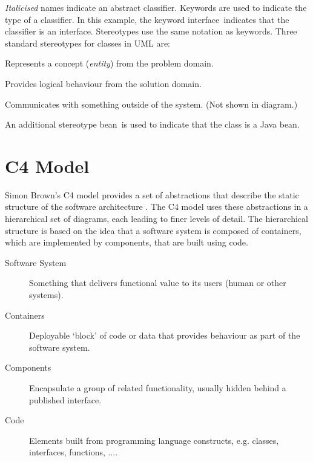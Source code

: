 \textit{Italicised} names indicate an abstract classifier. Keywords are used to indicate the type of a classifier.
In this example, the keyword \guillemotleft interface\guillemotright~indicates that the classifier is an interface.
Stereotypes use the same notation as keywords. Three standard stereotypes for classes in UML are:
\begin{description}[nosep,left=5mm]
    \item[\guillemotleft entity\guillemotright] Represents a concept (\emph{entity}) from the problem domain.
    \item[\guillemotleft control\guillemotright] Provides logical behaviour from the solution domain.
    \item[\guillemotleft boundary\guillemotright] Communicates with something outside of the system. (Not shown in diagram.)
\end{description}
An additional stereotype \guillemotleft bean\guillemotright~is used to indicate that the class is a Java bean.

\section{C4 Model}
Simon Brown's C4 model provides a set of abstractions that describe the static structure of the software architecture \cite{brown2022c4}.
The C4 model uses these abstractions in a hierarchical set of diagrams, each leading to finer levels of detail.
The hierarchical structure is based on the idea that a software system is composed of containers, which are implemented by components, that are built using code.
\begin{description}
    \item[Software System] Something that delivers functional value to its users (human or other systems).
    \item[Containers] Deployable `block' of code or data that provides behaviour as part of the software system.
    \item[Components] Encapsulate a group of related functionality, usually hidden behind a published interface.
    \item[Code] Elements built from programming language constructs, e.g. classes, interfaces, functions, ....
\end{description}


